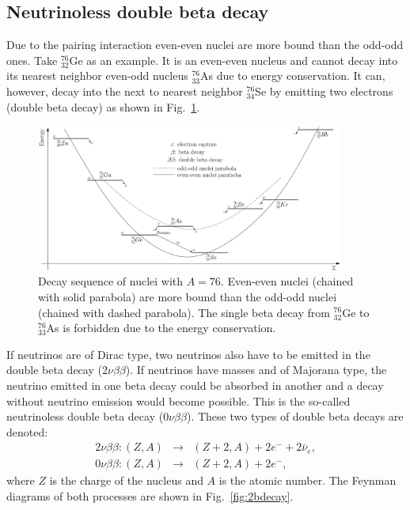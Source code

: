 \subsection{Neutrinoless double beta decay}
\label{sec:nonubb}
Due to the pairing interaction even-even nuclei are more bound than the odd-odd ones. Take $^{76}_{32}$Ge as an example. It is an even-even nucleus and cannot decay into its nearest neighbor even-odd nucleus $^{76}_{33}$As due to energy conservation. It can, however, decay into the next to nearest neighbor $^{76}_{34}$Se by emitting two electrons (double beta decay) as shown in Fig.~\ref{fig:ee2oo}. 
\begin{figure}[tbhp]
\centering
\includegraphics[width=0.9\textwidth]{Espec0nu2b}  
\caption{Decay sequence of nuclei with $A=76$. Even-even nuclei (chained with solid parabola) are more bound than the odd-odd nuclei (chained with dashed parabola). The single beta decay from $^{76}_{32}$Ge to $^{76}_{33}$As is forbidden due to the energy
conservation.}
\label{fig:ee2oo}
\end{figure}
If neutrinos are of Dirac type, two neutrinos also have to be emitted in the double beta decay ($2\nu\beta\beta$). If neutrinos have masses and of Majorana type, the neutrino emitted in one beta decay could be absorbed in another and a decay without neutrino emission would become possible. This is the so-called neutrinoless double beta decay ($0\nu\beta\beta$). These two types of double beta decays are denoted:
\begin{eqnarray}
2\nu\beta\beta: (Z,A) &\rightarrow& (Z+2,A) + 2e^{-} +
2\bar{\nu}_{e}, \\\label{eq:2nu2b}
0\nu\beta\beta: (Z,A) &\rightarrow& (Z+2,A) + 2e^{-},
\label{eq:0nu2b}
\end{eqnarray}
where $Z$ is the charge of the nucleus and $A$ is the atomic number.
The Feynman diagrams of both processes are shown in
Fig.~\ref{fig:2bdecay}.
